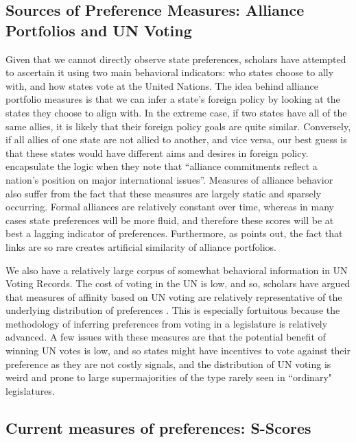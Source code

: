 \subsection*{Sources of Preference Measures: Alliance Portfolios and UN Voting}

Given that we cannot directly observe state preferences, scholars have attempted to ascertain it using two main behavioral indicators: who states choose to ally with, and how states vote at the United Nations. The idea behind alliance portfolio measures is that we can infer a state's foreign policy by looking at the states they choose to align with. In the extreme case, if two states have all of the same allies, it is likely that their foreign policy goals are quite similar. Conversely, if all allies of one state are not allied to another, and vice versa, our best guess is that these states would have different aims and desires in foreign policy. \citet{buenodemesquita:lalman:2008} encapsulate the logic when they note that ``alliance commitments reflect a nation's position on major international issues''. Measures of alliance behavior also suffer from the fact that these measures are largely static and sparsely occurring. Formal alliances are relatively constant over time, whereas in many cases state preferences will be more fluid, and therefore these scores will be at best a lagging indicator of preferences. Furthermore, as \citet{hage:2011} points out, the fact that links are so rare creates artificial similarity of alliance portfolios.

We also have a relatively large corpus of somewhat behavioral information in UN Voting Records. The cost of voting in the UN is low, and so, scholars have argued that measures of affinity based on UN voting are relatively representative of the underlying distribution of preferences \citep{gartzke:1998}. This is especially fortuitous because the methodology of inferring preferences from voting in a legislature is relatively advanced. A few issues with these measures are that the potential benefit of winning UN votes is low, and so states might have incentives to vote against their preference as they are not costly signals, and the distribution of UN voting is weird and prone to large supermajorities of the type rarely seen in ``ordinary" legislatures.

\subsection*{Current measures of preferences: S-Scores}

